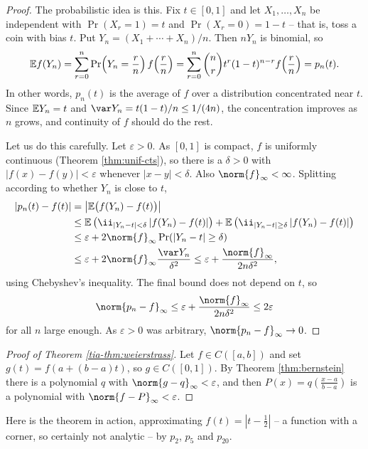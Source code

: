 \documentclass[a4paper]{scrartcl}
\begin{document}
\begin{proof}
	The probabilistic idea is this. Fix $t\in[0,1]$ and let $X_1,\ldots,X_n$ be independent with $\Pr(X_r=1)=t$ and $\Pr(X_r=0)=1-t$ -- that is, toss a coin with bias $t$. Put $Y_n = (X_1+\cdots+X_n)/n$. Then $nY_n$ is binomial, so
	$$\mathbb{E} f(Y_n) = \sum_{r=0}^n \Pr\!\left(Y_n = \frac rn\right)f\!\left(\frac rn\right) = \sum_{r=0}^n\binom nr t^r(1-t)^{n-r}f\!\left(\frac rn\right) = p_n(t).$$
	In other words, $p_n(t)$ is the average of $f$ over a distribution concentrated near $t$. Since $\mathbb{E} Y_n = t$ and $\var Y_n = t(1-t)/n \leq 1/(4n)$, the concentration improves as $n$ grows, and continuity of $f$ should do the rest.

	Let us do this carefully. Let $\varepsilon>0$. As $[0,1]$ is compact, $f$ is uniformly continuous (Theorem \ref{thm:unif-cts}), so there is a $\delta>0$ with $|f(x)-f(y)|<\varepsilon$ whenever $|x-y|<\delta$. Also $\norm{f}_\infty<\infty$. Splitting according to whether $Y_n$ is close to $t$,
	\begin{align*}
		|p_n(t)-f(t)| &= \left|\EE\big(f(Y_n)-f(t)\big)\right| \\
		&\leq \EE\left(\ii_{|Y_n-t|<\delta}\,|f(Y_n)-f(t)|\right) + \EE\left(\ii_{|Y_n-t|\geq\delta}\,|f(Y_n)-f(t)|\right)\\
		&\leq \varepsilon + 2\norm{f}_\infty\Pr(|Y_n-t|\geq\delta) \\
		&\leq \varepsilon + 2\norm{f}_\infty\frac{\var Y_n}{\delta^2} \leq \varepsilon + \frac{\norm{f}_\infty}{2n\delta^2},
	\end{align*}
	using Chebyshev's inequality. The final bound does not depend on $t$, so
	$$\norm{p_n-f}_\infty \leq \varepsilon + \frac{\norm{f}_\infty}{2n\delta^2} \leq 2\varepsilon$$
	for all $n$ large enough. As $\varepsilon>0$ was arbitrary, $\norm{p_n-f}_\infty\to0$.
\end{proof}

\begin{proof}[Proof of Theorem \ref{tia-thm:weierstrass}]
	Let $f\in C([a,b])$ and set $g(t) = f(a + (b-a)t)$, so $g \in C([0,1])$. By Theorem \ref{thm:bernstein} there is a polynomial $q$ with $\norm{g-q}_\infty<\varepsilon$, and then $P(x) = q\left(\frac{x-a}{b-a}\right)$ is a polynomial with $\norm{f-P}_\infty<\varepsilon$.
\end{proof}

Here is the theorem in action, approximating $f(t) = |t-\tfrac12|$ -- a function with a corner, so certainly not analytic -- by $p_2$, $p_5$ and $p_{20}$.
\end{document}
